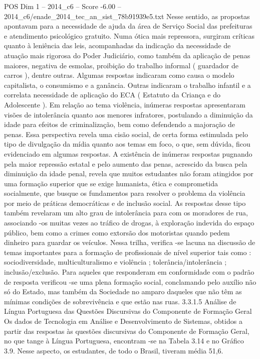 \begin{textsample}{POS Dim 1 – 2014\_c6 – Score -6.00 – 2014\_c6/enade\_2014\_tec\_an\_sist\_78b91939e5.txt}
Nesse sentido, as propostas apontavam para a necessidade de ajuda da área de Serviço Social das prefeituras e atendimento psicológico gratuito.
Numa ótica mais repressora, surgiram críticas quanto à leniência das leis, acompanhadas da indicação da necessidade de atuação mais rigorosa do Poder Judiciário, como também da aplicação de penas maiores, negativa de esmolas, proibição do trabalho informal ( guardador de carros ), dentre outras.
Algumas respostas indicaram como causa o modelo capitalista, o consumismo e a ganância.
Outras indicaram o trabalho infantil e a correlata necessidade de aplicação do ECA ( Estatuto da Criança e do Adolescente ).
Em relação ao tema violência, inúmeras respostas apresentaram visões de intolerância quanto aos menores infratores, postulando a diminuição da idade para efeitos de criminalização, bem como defendendo a majoração de penas.
Essa perspectiva revela uma cisão social, de certa forma estimulada pelo tipo de divulgação da mídia quanto aos temas em foco, o que, sem dúvida, ficou evidenciado em algumas respostas.
A existência de inúmeras respostas pugnando pela maior repressão estatal e pelo aumento das penas, acrescido da busca pela diminuição da idade penal, revela que muitos estudantes não foram atingidos por uma formação superior que se exige humanista, ética e comprometida socialmente, que busque os fundamentos para resolver o problema da violência por meio de práticas democráticas e de inclusão social.
As respostas desse tipo também revelaram um alto grau de intolerância para com os moradores de rua, associando -os muitas vezes ao tráfico de drogas, à exploração indevida do espaço público, bem como a crimes como extorsão dos motoristas quando pedem dinheiro para guardar os veículos.
Nessa trilha, verifica -se lacuna na discussão de temas importantes para a formação de profissionais de nível superior tais como : sociodiversidade, multiculturalismo e violência ; tolerância/intolerância ; inclusão/exclusão.
Para aqueles que responderam em conformidade com o padrão de resposta verificou -se uma plena formação social, conclamando pelo auxílio não só do Estado, mas também da Sociedade no amparo daqueles que não têm as mínimas condições de sobrevivência e que estão nas ruas. 3.3.1.5 Análise de Língua Portuguesa das Questões Discursivas do Componente de Formação Geral Os dados de Tecnologia em Análise e Desenvolvimento de Sistemas, obtidos a partir das respostas às questões discursivas do Componente de Formação Geral, no que tange à Língua Portuguesa, encontram -se na Tabela 3.14 e no Gráfico 3.9.
Nesse aspecto, os estudantes, de todo o Brasil, tiveram média 51,6.

\end{textsample}
